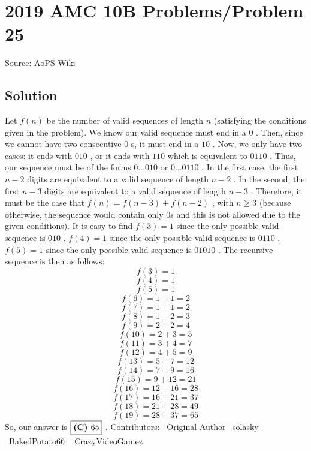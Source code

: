 \documentclass[12pt]{article}
\begin{document}
\section*{{2019 AMC 10B Problems/Problem 25}}
Source: AoPS Wiki

\subsection*{Solution}
Let $f(n)$ be the number of valid sequences of length $n$ (satisfying the conditions given in the problem). We know our valid sequence must end in a $0$ . Then, since we cannot have two consecutive $0$ s, it must end in a $10$ . Now, we only have two cases: it ends with $010$ , or it ends with $110$ which is equivalent to $0110$ . Thus, our sequence must be of the forms $0\ldots010$ or $0\ldots0110$ . In the first case, the first $n-2$ digits are equivalent to a valid sequence of length $n-2$ . In the second, the first $n-3$ digits are equivalent to a valid sequence of length $n-3$ . Therefore, it must be the case that $f(n) = f(n-3) + f(n-2)$ , with $n \ge 3$ (because otherwise, the sequence would contain only 0s and this is not allowed due to the given conditions). It is easy to find $f(3) = 1$ since the only possible valid sequence is $010$ . $f(4)=1$ since the only possible valid sequence is $0110$ . $f(5)=1$ since the only possible valid sequence is $01010$ . The recursive sequence is then as follows: \[f(3)=1\] \[f(4)=1\] \[f(5) = 1\] \[f(6) = 1 + 1 = 2\] \[f(7) = 1 + 1 = 2\] \[f(8) = 1 + 2 = 3\] \[f(9) = 2 + 2 = 4\] \[f(10) = 2 + 3 = 5\] \[f(11) = 3 + 4 = 7\] \[f(12) = 4 + 5 = 9\] \[f(13) = 5 + 7 = 12\] \[f(14) = 7 + 9 = 16\] \[f(15) = 9 + 12 = 21\] \[f(16) = 12 + 16 = 28\] \[f(17) = 16 + 21 = 37\] \[f(18) = 21 + 28 = 49\] \[f(19) = 28 + 37 = 65\] So, our answer is $\boxed{\text{\bf{(C)} } 65}$ . Contributors: ~Original Author ~solasky ~BakedPotato66 ~ CrazyVideoGamez
\end{document}
